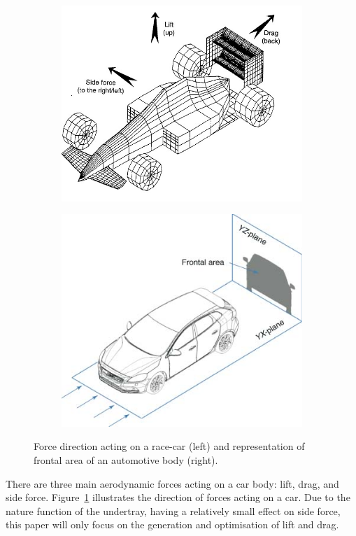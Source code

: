 \begin{figure}[!h]
\begin{center}
%    
  \begin{subfigure}[b]{0.4\textwidth}
    \includegraphics[scale=0.4]{Figures/race_car_forces.jpg}
  \end{subfigure}
  \begin{subfigure}[b]{0.4\textwidth}
    \includegraphics[scale=0.8]{Figures/frontal_area.jpg}
  \end{subfigure}
%  
  \caption{Force direction acting on a race-car (left) and representation of frontal area of an automotive body (right)\cite{Sebben2014FundamentalsDesign}.}
    \label{fig:Force direction and frontal area}
\end{center}
\end{figure}
\noindent There are three main aerodynamic forces acting on a car body: lift, drag, and side force. Figure~\ref{fig:Force direction and frontal area} illustrates the direction of forces acting on a car. Due to the nature function of the undertray, having a relatively small effect on side force, this paper will only focus on the generation and optimisation of lift and drag.


